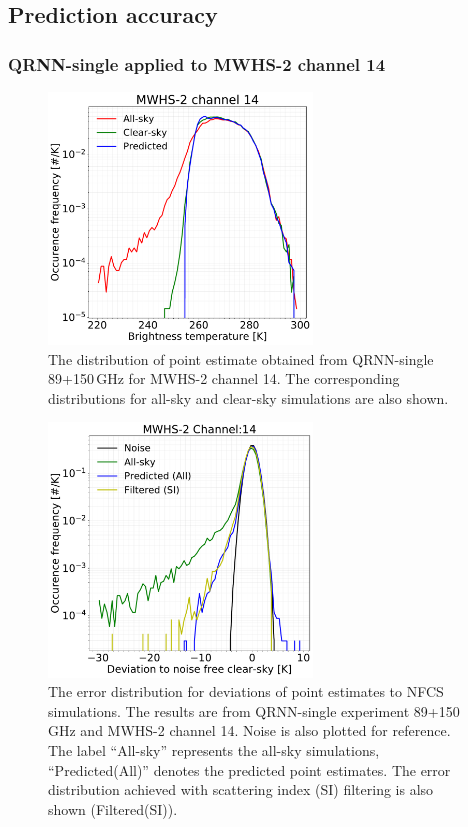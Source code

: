\documentclass[amt, manuscript]{copernicus}
\begin{document}
\subsection{Prediction accuracy}

\subsubsection{QRNN-single applied to MWHS-2 channel 14} 
\begin{figure}[t]
	\centering
	\includegraphics[width = 70mm]{Figures/QRNN_output_mwhs.pdf} 
	\caption{The distribution of point estimate obtained from QRNN-single 89+150\,GHz for MWHS-2 channel 14. The corresponding distributions for all-sky and clear-sky simulations are also shown.}
	\label{fig:distribution_predicted_mwhs14}	
\end{figure}
\begin{figure}[t]
	\centering
	\includegraphics[width = 70mm]{Figures/MWHS_error_dist_14.pdf} 
	\caption{The error distribution for deviations of point estimates to NFCS simulations. The results are from QRNN-single experiment 89+150\,GHz and MWHS-2 channel 14. Noise is also plotted for reference. The label ``All-sky'' represents the all-sky simulations, ``Predicted(All)'' denotes the predicted point estimates. The error distribution achieved with scattering index (SI) filtering is also shown (Filtered(SI)). }
	\label{fig:error_distribution_mwhs14}	
\end{figure}
\end{document}
